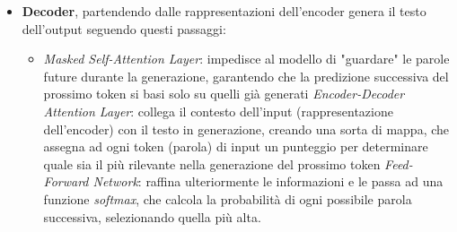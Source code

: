 \documentclass{article}
\begin{document}
\begin{itemize}
\begin{itemize}
\begin{itemize}
    \end{itemize}
    
    \item \textbf{Decoder}, partendendo dalle rappresentazioni dell'encoder genera il testo dell'output seguendo questi passaggi:
    \begin{itemize}
        \item \textit{Masked Self-Attention Layer}: impedisce al modello di "guardare" le parole future durante la generazione, garantendo che la predizione successiva del prossimo token si basi solo su quelli già generati
        \textit{Encoder-Decoder Attention Layer}: collega il contesto dell’input (rappresentazione dell'encoder) con il testo in generazione, creando una sorta di mappa, che assegna ad ogni token (parola) di input un punteggio per determinare quale sia il più rilevante nella generazione del prossimo token
        \textit{Feed-Forward Network}: raffina ulteriormente le informazioni e le passa ad una funzione \textit{softmax}, che calcola la probabilità di ogni possibile parola successiva, selezionando quella più alta.
    \end{itemize}


\end{itemize}
\end{itemize}
\end{document}

